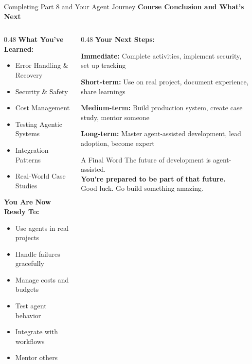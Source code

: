 \documentclass[aspectratio=169,11pt]{beamer}
\begin{document}
\begin{frame}{Completing Part 8 and Your Agent Journey}
    \textbf{Course Conclusion and What's Next}

    \begin{columns}[T]
        \begin{column}{0.48\textwidth}
            \textbf{What You've Learned:}
            \begin{itemize}
                \item[\checkmark] Error Handling \& Recovery
                \item[\checkmark] Security \& Safety
                \item[\checkmark] Cost Management
                \item[\checkmark] Testing Agentic Systems
                \item[\checkmark] Integration Patterns
                \item[\checkmark] Real-World Case Studies
            \end{itemize}

            \textbf{You Are Now Ready To:}
            \begin{itemize}
                \item Use agents in real projects
                \item Handle failures gracefully
                \item Manage costs and budgets
                \item Test agent behavior
                \item Integrate with workflows
                \item Mentor others
            \end{itemize}
        \end{column}
        \begin{column}{0.48\textwidth}
            \textbf{Your Next Steps:}

            \textbf{Immediate:}
            Complete activities, implement security, set up tracking

            \textbf{Short-term:}
            Use on real project, document experience, share learnings

            \textbf{Medium-term:}
            Build production system, create case study, mentor someone

            \textbf{Long-term:}
            Master agent-assisted development, lead adoption, become expert

            \vspace{0.3cm}
            \begin{block}{A Final Word}
                The future of development is agent-assisted.\\
                \textbf{You're prepared to be part of that future.}\\
                Good luck. Go build something amazing.
            \end{block}
        \end{column}
    \end{columns}
\end{frame}
\end{document}
